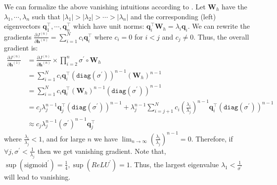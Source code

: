 We can formalize the above vanishing intuitions according to .
Let $\bm{W}_h$ have the  $\lambda_1, \cdots, \lambda_n$ such that $|\lambda_1| > |\lambda_2| > \cdots > |\lambda_n|$ and the corresponding (left) eigenvectors $\bm{q}_1^\top, \cdots, \bm{q}_n^\top$ which have unit norms: $\bm{q}_i^\top \bm{W}_h = \lambda_i \bm{q}_i$.
We can rewrite the gradients $\frac{\partial J^{(n)}}{\partial \bm{h}^{(n)}} = \sum_{i=1}^N c_i \bm{q}_i^\top$ where $c_i = 0$ for $i < j$ and $c_j \ne 0$.
Thus, the overall gradient is:
\begin{align}
\frac{\partial J^{(n)}}{\partial \bm{h}^{(1)}} &= \frac{\partial J^{(n)}}{\partial \bm{h}^{(n)}} \times \prod_{i=2}^n \sigma^\prime \circ \bm{W}_h \nonumber \\ 
&= \sum_{i=1}^N c_i \bm{q}_i^\top (\texttt{diag}(\sigma^\prime))^{n-1} (\bm{W}_h)^{n-1} \nonumber \\
&= \sum_{i=1}^N c_i \bm{q}_i^\top (\bm{W}_h)^{n-1} (\texttt{diag}(\sigma^\prime))^{n-1} \nonumber \\
&= c_j \lambda_j^{n-1} \bm{q}_j^\top (\texttt{diag}(\sigma^\prime))^{n-1} + \lambda_j^{n-1} \sum_{i=j+1}^N c_i \left(\frac{\lambda_i}{\lambda_j}\right)^{n-1} \bm{q}_i^\top  (\texttt{diag}(\sigma^\prime))^{n-1} \nonumber \nonumber \\
&\approx c_j \lambda_j^{n-1} (\sigma^\prime)^{n-1} \bm{q}_j^\top \nonumber
\end{align}
where $\frac{\lambda_i}{\lambda_j} < 1$, and for large $n$ we have $\lim_{n \to \infty} \left(\frac{\lambda_i}{\lambda_j}\right)^{n-1} = 0$.
Therefore, if $\forall j, \sigma^\prime < \frac{1}{\lambda_j}$ then we get vanishing gradient.
Note that, $\sup(\text{sigmoid}^\prime) = \frac{1}{4}, \sup(ReLU^\prime) = 1$.
Thus, the largest eigenvalue $\lambda_1 < \frac{1}{\sigma^\prime}$ will lead to vanishing.

